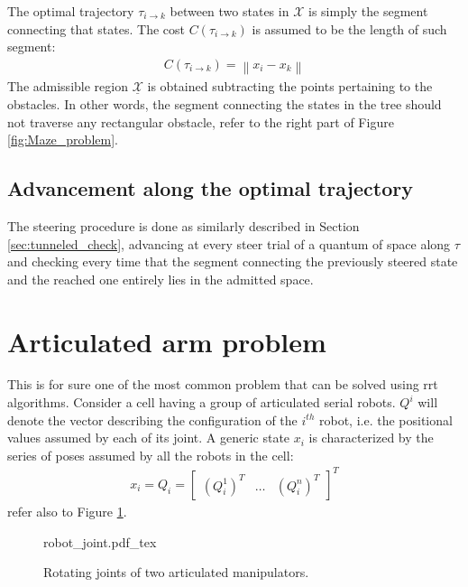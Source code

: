 The optimal trajectory $\tau_{i \rightarrow k}$ between two states in $\mathcal{X}$ is simply the segment connecting that states. 
The cost $C(\tau_{i \rightarrow k})$ is assumed to be the length of such segment:
\begin{eqnarray}
C(\tau_{i \rightarrow k}) = \left \| x_i - x_k \right \|
\end{eqnarray}
The admissible region $\underline{\mathcal{X}}$ is obtained subtracting the points pertaining to the obstacles. In other words, the segment connecting the states in the tree should not traverse any rectangular obstacle, refer to the right part of Figure \ref{fig:Maze_problem}.

\subsection{Advancement along the optimal trajectory}

The steering procedure is done as similarly described in Section \ref{sec:tunneled_check}, advancing at every steer trial of a quantum of space along $\tau$ and checking every time that the segment 
connecting the previously steered state and the reached one entirely lies in the admitted space.

\section{Articulated arm problem}

This is for sure one of the most common problem that can be solved using rrt algorithms. Consider a cell having a group of articulated serial robots.
$Q^{i}$ will denote the vector describing the configuration of the $i^{th}$ robot, i.e. the positional values assumed by each of its joint.
A generic state $x_i$ is characterized by the series of poses assumed by all the robots in the cell:
\begin{eqnarray}
x_i = Q_i = \begin{bmatrix} (Q^1_i)^T & \hdots & (Q^n_i)^T \end{bmatrix}^T
\end{eqnarray}
refer also to Figure \ref{fig:q_example}.

 \begin{figure}
	 \centering
 \def\svgwidth{0.8 \columnwidth}
 {robot_joint.pdf_tex} 
	 \caption{Rotating joints of two articulated manipulators.}
 \label{fig:q_example}
 \end{figure}

